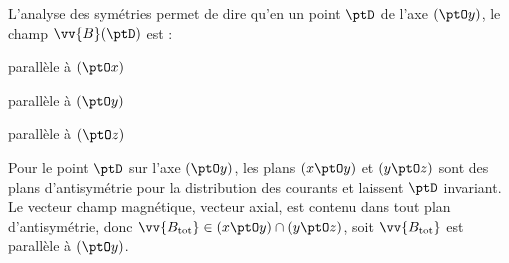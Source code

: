 


\begin{enonce}
L'analyse des symétries permet de dire qu'en un point $\ptD$ de l'axe $(\ptO y)$, le champ $\vv{B}(\ptD)$ est : 
\begin{listeQCM3Colonnes}
		\item parallèle à $(\ptO x)$
		\item parallèle à $(\ptO y)$
		\item parallèle à $(\ptO z)$
\end{listeQCM3Colonnes}
\bigskip
\end{enonce}

\reponse{$\reponseB{}$}

\begin{corrige}
Pour le point $\ptD$ sur l'axe $(\ptO y)$, les plans $(x \ptO y)$ et $(y \ptO z)$ sont des plans d'antisymétrie pour la distribution des courants et laissent $\ptD$ invariant. Le vecteur champ magnétique, vecteur axial, est contenu dans tout plan d'antisymétrie, donc $\vv{B_{\text{tot}}} \in (x \ptO y)\cap (y \ptO z)$, soit $\vv{B_{\text{tot}}}$ est parallèle à  $(\ptO y)$. 
\end{corrige}


\finEntrainement



\newpage




\hauteurLargeurCadreReponse		{8mm}{2cm}
\initialisationEntrainement


